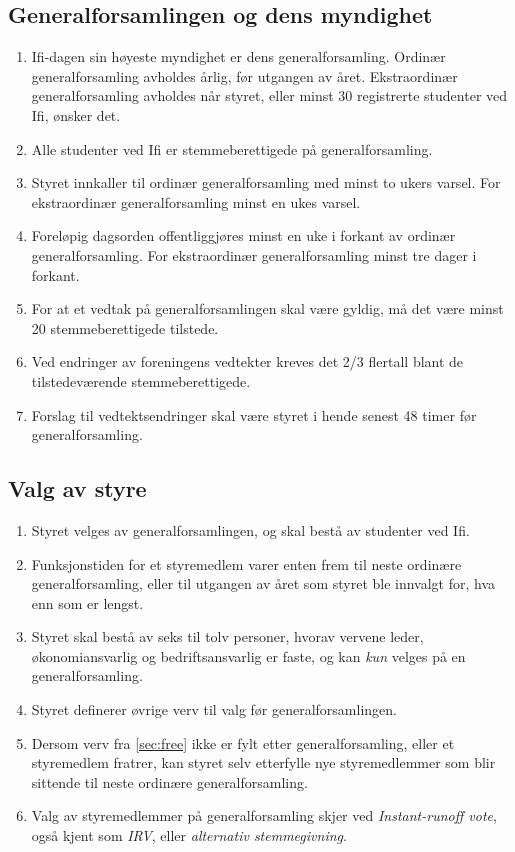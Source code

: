 \documentclass[norsk,a4paper]{article}
\begin{document}
\subsection{Generalforsamlingen og dens myndighet}
\begin{enumerate}
	\item{Ifi-dagen sin høyeste myndighet er dens generalforsamling. Ordinær generalforsamling avholdes årlig, før utgangen av året. Ekstraordinær generalforsamling avholdes når styret, eller minst 30 registrerte studenter ved Ifi, ønsker det.}
	\item{Alle studenter ved Ifi er stemmeberettigede på generalforsamling.}
	\item{Styret innkaller til ordinær generalforsamling med minst to ukers varsel. For ekstraordinær generalforsamling minst en ukes varsel.}
	\item{Foreløpig dagsorden offentliggjøres minst en uke i forkant av ordinær generalforsamling. For ekstraordinær generalforsamling minst tre dager i forkant.}
	\item{For at et vedtak på generalforsamlingen skal være gyldig, må det være minst 20 stemmeberettigede tilstede.}
	\item{Ved endringer av foreningens vedtekter kreves det 2/3 flertall blant de tilstedeværende stemmeberettigede.}
	\item{Forslag til vedtektsendringer skal være styret i hende senest 48 timer før generalforsamling.}
\end{enumerate}

\subsection{Valg av styre}
\begin{enumerate}
	\item Styret velges av generalforsamlingen, og skal bestå av studenter ved Ifi.
	\item Funksjonstiden for et styremedlem varer enten frem til neste ordinære generalforsamling, eller til utgangen av året som styret ble innvalgt for, hva enn som er lengst.
	\item Styret skal bestå av seks til tolv personer, hvorav vervene leder, økonomiansvarlig og bedriftsansvarlig er faste, og kan \textit{kun} velges på en generalforsamling\label{sec:protected}.
	\item Styret definerer øvrige verv til valg før generalforsamlingen\label{sec:free}.
	\item Dersom verv fra \cref{sec:free} ikke er fylt etter generalforsamling, eller et styremedlem fratrer, kan styret selv etterfylle nye styremedlemmer som blir sittende til neste ordinære generalforsamling.
	\item Valg av styremedlemmer på generalforsamling skjer ved \textit{Instant-runoff vote}, også kjent som \textit{IRV}, eller \textit{alternativ stemmegivning}.
\end{enumerate}
\end{document}
